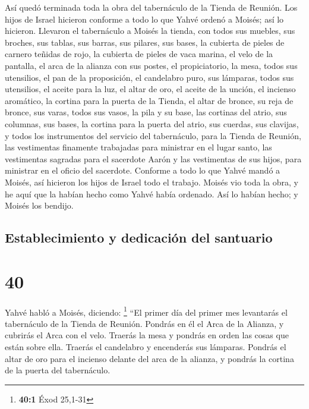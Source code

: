  Así quedó terminada toda la obra del tabernáculo de la
Tienda de Reunión. Los hijos de Israel hicieron conforme a todo lo que
Yahvé ordenó a Moisés; así lo hicieron.  Llevaron el
tabernáculo a Moisés la tienda, con todos sus muebles, sus broches, sus
tablas, sus barras, sus pilares, sus bases,  la cubierta
de pieles de carnero teñidas de rojo, la cubierta de pieles de vaca
marina, el velo de la pantalla,  el arca de la alianza
con sus postes, el propiciatorio,  la mesa, todos sus
utensilios, el pan de la proposición,  el candelabro
puro, sus lámparas, todos sus utensilios, el aceite para la luz,
 el altar de oro, el aceite de la unción, el incienso
aromático, la cortina para la puerta de la Tienda,  el
altar de bronce, su reja de bronce, sus varas, todos sus vasos, la pila
y su base,  las cortinas del atrio, sus columnas, sus
bases, la cortina para la puerta del atrio, sus cuerdas, sus clavijas, y
todos los instrumentos del servicio del tabernáculo, para la Tienda de
Reunión,  las vestimentas finamente trabajadas para
ministrar en el lugar santo, las vestimentas sagradas para el sacerdote
Aarón y las vestimentas de sus hijos, para ministrar en el oficio del
sacerdote.  Conforme a todo lo que Yahvé mandó a Moisés,
así hicieron los hijos de Israel todo el trabajo.  Moisés
vio toda la obra, y he aquí que la habían hecho como Yahvé había
ordenado. Así lo habían hecho; y Moisés los bendijo.

\hypertarget{establecimiento-y-dedicaciuxf3n-del-santuario}{%
\subsection{Establecimiento y dedicación del
santuario}\label{establecimiento-y-dedicaciuxf3n-del-santuario}}

\hypertarget{section-39}{%
\section{40}\label{section-39}}

 Yahvé habló a Moisés, diciendo: \footnote{\textbf{40:1}
  Éxod 25,1-31}  ``El primer día del primer mes levantarás
el tabernáculo de la Tienda de Reunión.  Pondrás en él el
Arca de la Alianza, y cubrirás el Arca con el velo. 
Traerás la mesa y pondrás en orden las cosas que están sobre ella.
Traerás el candelabro y encenderás sus lámparas.  Pondrás
el altar de oro para el incienso delante del arca de la alianza, y
pondrás la cortina de la puerta del tabernáculo.

